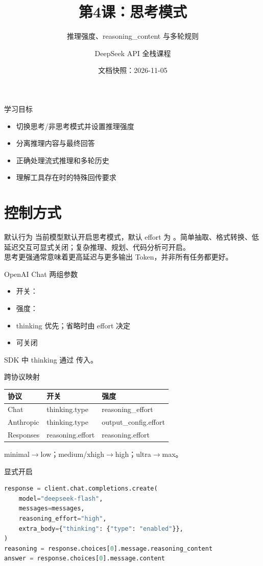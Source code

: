 \documentclass[aspectratio=169,UTF8]{ctexbeamer}
\title{第4课：思考模式}
\subtitle{推理强度、reasoning\_content 与多轮规则}
\author{DeepSeek API 全栈课程}
\date{文档快照：2026-11-05}
\begin{document}
\frame{\titlepage}
\begin{frame}{学习目标}
\begin{itemize}
  \item 切换思考/非思考模式并设置推理强度
  \item 分离推理内容与最终回答
  \item 正确处理流式推理和多轮历史
  \item 理解工具存在时的特殊回传要求
\end{itemize}
\end{frame}
\section{控制方式}
\begin{frame}{默认行为}
当前模型默认开启思考模式，默认 effort 为 。简单抽取、格式转换、低延迟交互可显式关闭；复杂推理、规划、代码分析可开启。\\[8pt]
思考更强通常意味着更高延迟与更多输出 Token，并非所有任务都更好。
\end{frame}
\begin{frame}{OpenAI Chat 两组参数}
\begin{itemize}
  \item 开关：
  \item 强度：
  \item thinking 优先；省略时由 effort 决定
  \item {} 可关闭
\end{itemize}
SDK 中 thinking 通过  传入。
\end{frame}
\begin{frame}{跨协议映射}
\begin{tabular}{lll}
\toprule
协议 & 开关 & 强度\\
\midrule
Chat & thinking.type & reasoning\_effort\\
Anthropic & thinking.type & output\_config.effort\\
Responses & reasoning.effort & reasoning.effort\\
\bottomrule
\end{tabular}
\vspace{6pt}

minimal$\rightarrow$low；medium/xhigh$\rightarrow$high；ultra$\rightarrow$max。
\end{frame}
\begin{frame}[fragile]{显式开启}
\begin{lstlisting}[language=Python]
response = client.chat.completions.create(
    model="deepseek-flash",
    messages=messages,
    reasoning_effort="high",
    extra_body={"thinking": {"type": "enabled"}},
)
reasoning = response.choices[0].message.reasoning_content
answer = response.choices[0].message.content
\end{lstlisting}
\end{frame}
\end{document}
